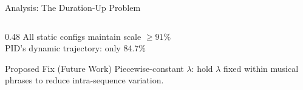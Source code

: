 \documentclass[aspectratio=169, 11pt]{beamer}
\begin{document}
\begin{frame}{Analysis: The Duration-Up Problem}
\begin{columns}[T]
\begin{column}{0.48\textwidth}
\vspace{0.2em}
All static configs maintain scale $\geq 91\%$\\
PID's dynamic trajectory: only 84.7\%

\vspace{0.3em}
\begin{block}{Proposed Fix (Future Work)}
\small
Piecewise-constant $\lambda$: hold $\lambda$ fixed within musical phrases to reduce intra-sequence variation.
\end{block}
\end{column}
\end{columns}

\end{frame}
\end{document}
